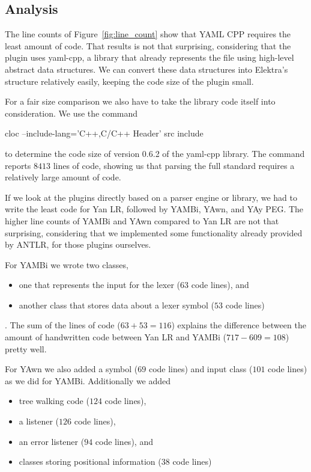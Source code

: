 \subsection{Analysis}

The line counts of Figure~\ref{fig:line_count} show that YAML CPP requires the least amount of code. That results is not that surprising, considering that the plugin uses yaml-cpp, a library that already represents the  file using high-level abstract data structures. We can convert these data structures into Elektra’s  structure relatively easily, keeping the code size of the plugin small.

For a fair size comparison we also have to take the library code itself into consideration. We use the command

\begin{shellcode}
  cloc --include-lang='C++,C/C++ Header' src include
\end{shellcode}

to determine the code size of version 0.6.2 of the yaml-cpp library. The command reports $8413$ lines of code, showing us that parsing the full  standard requires a relatively large amount of code.

If we look at the plugins directly based on a parser engine or library, we had to write the least code for Yan LR, followed by YAMBi, YAwn, and YAy PEG. The higher line counts of YAMBi and YAwn compared to Yan LR are not that surprising, considering that we implemented some functionality already provided by ANTLR, for those plugins ourselves.

For YAMBi we wrote two classes,

\begin{itemize}
  \item one that represents the input for the lexer ($63$ code lines), and
  \item another class that stores data about a lexer symbol ($53$ code lines)
\end{itemize}

. The sum of the lines of code ($63 + 53 = 116$) explains the difference between the amount of handwritten code between Yan LR and YAMBi ($717 - 609 = 108$) pretty well.

For YAwn we also added a symbol ($69$ code lines) and input class ($101$ code lines) as we did for YAMBi. Additionally we added

\begin{itemize}
  \item tree walking code ($124$ code lines),
  \item a listener ($126$ code lines),
  \item an error listener ($94$ code lines), and
  \item classes storing positional information ($38$ code lines)
\end{itemize}

